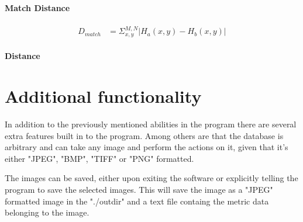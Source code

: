 \paragraph{Match Distance}
\begin{align}
	D_{match} & = \Sigma^{M,N}_{x,y} |H_a(x,y) - H_b(x,y)|
\end{align}

\paragraph{ Distance}

\section{Additional functionality}
In addition to the previously mentioned abilities in the program there are
several extra features built in to the program.  Among others are that the
database is arbitrary and can take any image and perform the actions on it, 
given that it's either "JPEG", "BMP", "TIFF" or "PNG" formatted.

The images can be saved, either upon exiting the software or explicitly telling
the program to save the selected images.  This will save the image as a "JPEG"
formatted image in the "./outdir" and a text file containg the metric data
belonging to the image.

